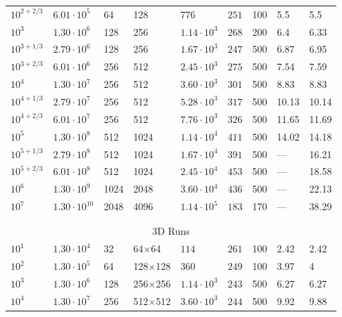 \documentclass[aps, pre, onecolumn, nofootinbib, notitlepage, groupedaddress, amsfonts, amssymb, amsmath, longbibliography]{revtex4-1}
\begin{document}
\begin{table}
\begin{center}
\begin{tabularx}{\textwidth}{ X X X X | X X X | X X }
$10^{2 + 2/3}$	&	$6.01 \cdot 10^5$	&	64	&	128	&	$776$	&	$251$	&	100	&	5.5	&	5.5	\\
$10^3$	&	$1.30 \cdot 10^6$	&	128	&	256	&	$1.14 \cdot 10^3$	&	$268$	&	200	&	6.4	&	6.33	\\
$10^{3 + 1/3}$	&	$2.79 \cdot 10^6$	&	128	&	256	&	$1.67 \cdot 10^3$	&	$247$	&	500	&	6.87	&	6.95	\\
$10^{3 + 2/3}$	&	$6.01 \cdot 10^6$	&	256	&	512	&	$2.45 \cdot 10^3$	&	$275$	&	500	&	7.54	&	7.59	\\
$10^4$	&	$1.30 \cdot 10^7$	&	256	&	512	&	$3.60 \cdot 10^3$	&	$301$	&	500	&	8.83	&	8.83	\\
$10^{4 + 1/3}$	&	$2.79 \cdot 10^7$	&	256	&	512	&	$5.28 \cdot 10^3$	&	$317$	&	500	&	10.13	&	10.14	\\
$10^{4 + 2/3}$	&	$6.01 \cdot 10^7$	&	256	&	512	&	$7.76 \cdot 10^3$	&	$326$	&	500	&	11.65	&	11.69	\\
$10^5$	&	$1.30 \cdot 10^8$	&	512	&	1024	&	$1.14 \cdot 10^4$	&	$411$	&	500	&	14.02	&	14.18	\\
$10^{5 + 1/3}$	&	$2.79 \cdot 10^8$	&	512	&	1024	&	$1.67 \cdot 10^4$	&	$391$	&	500	&	---	&	16.21	\\
$10^{5 + 2/3}$	&	$6.01 \cdot 10^8$	&	512	&	1024	&	$2.45 \cdot 10^4$	&	$453$	&	500	&	---	&	18.58	\\
$10^6$	&	$1.30 \cdot 10^9$	&	1024	&	2048	&	$3.60 \cdot 10^4$	&	$436$	&	500	&	---	&	22.13	\\
$10^7$	&	$1.30 \cdot 10^{10}$	&	2048	&	4096	&	$1.14 \cdot 10^5$	&	$183$	&	170	&	---	&	38.29	\\
\\ \hline \hline \multicolumn{9}{c}{\vspace{-0.2cm}}\\
\multicolumn{9}{c}{\vspace{0.1cm}3D Runs} \\
\hline
$10^1$	&	$1.30 \cdot 10^4$	&	32	&	64$\times$64	&	$114$	&	$261$	&	100	&	2.42	&	2.42	\\
$10^2$	&	$1.30 \cdot 10^5$	&	64	&	128$\times$128	&	$360$	&	$249$	&	100	&	3.97	&	4	\\
$10^3$	&	$1.30 \cdot 10^6$	&	128	&	256$\times$256	&	$1.14 \cdot 10^3$	&	$243$	&	500	&	6.27	&	6.27	\\
$10^4$	&	$1.30 \cdot 10^7$	&	256	&	512$\times$512	&	$3.60 \cdot 10^3$	&	$244$	&	500	&	9.92	&	9.88	\\
\hline																	
\end{tabularx}
\end{center}
\end{table}
\end{document}
